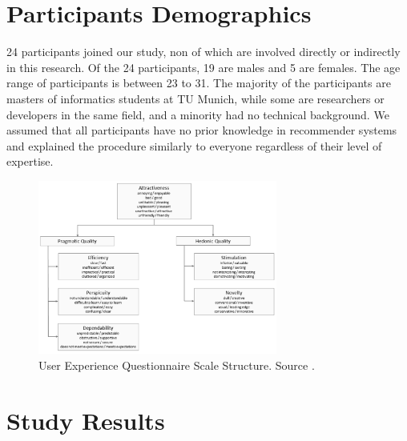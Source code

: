 \section{Participants Demographics}
24 participants joined our study, non of which are involved directly or
indirectly in this research.
Of the 24 participants, 19 are males and 5 are females. The age range of
participants is between 23 to 31. The majority of the participants are masters
of informatics students at TU Munich, while some are researchers or developers
in the same field, and a minority had no technical background. We assumed that
all participants have no prior knowledge in recommender systems and explained the procedure similarly to everyone regardless
of their level of expertise.

\begin{figure}[t]
\centering
\includegraphics[width=0.7\textwidth]{figures/UEQ-scales}
\caption{User Experience Questionnaire Scale Structure. Source
\cite{UEQHandbook}.}
\label{fig:figure512}
\end{figure}

\section{Study Results}
